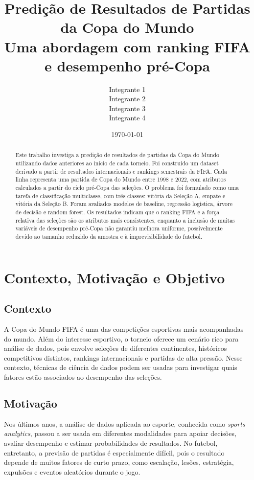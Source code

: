 \documentclass[12pt,a4paper]{article}
\title{
    \textbf{Predição de Resultados de Partidas da Copa do Mundo}\\
    \large Uma abordagem com ranking FIFA e desempenho pré-Copa
}
\author{
    Integrante 1 \\
    Integrante 2 \\
    Integrante 3 \\
    Integrante 4
}
\date{\today}
\begin{document}
\maketitle

\tableofcontents
\newpage

\begin{abstract}
Este trabalho investiga a predição de resultados de partidas da Copa do Mundo
utilizando dados anteriores ao início de cada torneio. Foi construído um dataset
derivado a partir de resultados internacionais e rankings semestrais da FIFA.
Cada linha representa uma partida de Copa do Mundo entre 1998 e 2022, com
atributos calculados a partir do ciclo pré-Copa das seleções. O problema foi
formulado como uma tarefa de classificação multiclasse, com três classes:
vitória da Seleção A, empate e vitória da Seleção B. Foram avaliados modelos de
baseline, regressão logística, árvore de decisão e random forest. Os resultados
indicam que o ranking FIFA e a força relativa das seleções são os atributos mais
consistentes, enquanto a inclusão de muitas variáveis de desempenho pré-Copa não
garantiu melhora uniforme, possivelmente devido ao tamanho reduzido da amostra e
à imprevisibilidade do futebol.
\end{abstract}

\section{Contexto, Motivação e Objetivo}

\subsection{Contexto}

A Copa do Mundo FIFA é uma das competições esportivas mais acompanhadas do
mundo. Além do interesse esportivo, o torneio oferece um cenário rico para
análise de dados, pois envolve seleções de diferentes continentes, históricos
competitivos distintos, rankings internacionais e partidas de alta pressão.
Nesse contexto, técnicas de ciência de dados podem ser usadas para investigar
quais fatores estão associados ao desempenho das seleções.

\subsection{Motivação}

Nos últimos anos, a análise de dados aplicada ao esporte, conhecida como
\textit{sports analytics}, passou a ser usada em diferentes modalidades para
apoiar decisões, avaliar desempenho e estimar probabilidades de resultados.
No futebol, entretanto, a previsão de partidas é especialmente difícil, pois o
resultado depende de muitos fatores de curto prazo, como escalação, lesões,
estratégia, expulsões e eventos aleatórios durante o jogo.
\end{document}
